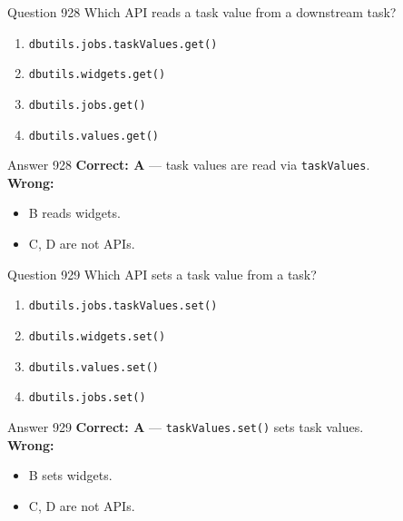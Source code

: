 \documentclass[aspectratio=169,11pt]{beamer}
\begin{document}
	\begin{frame}{Question 928}
		Which API reads a task value from a downstream task?
		\begin{enumerate}[label=\Alph*.]
			\item \texttt{dbutils.jobs.taskValues.get()}
			\item \texttt{dbutils.widgets.get()}
			\item \texttt{dbutils.jobs.get()}
			\item \texttt{dbutils.values.get()}
		\end{enumerate}
	\end{frame}
	\begin{frame}{Answer 928}
		\textbf{Correct: A} --- task values are read via \texttt{taskValues}.\\
		\vspace{0.5em}
		\textbf{Wrong:}
		\begin{itemize}
			\item B reads widgets.
			\item C, D are not APIs.
		\end{itemize}
	\end{frame}
	
	\begin{frame}{Question 929}
		Which API sets a task value from a task?
		\begin{enumerate}[label=\Alph*.]
			\item \texttt{dbutils.jobs.taskValues.set()}
			\item \texttt{dbutils.widgets.set()}
			\item \texttt{dbutils.values.set()}
			\item \texttt{dbutils.jobs.set()}
		\end{enumerate}
	\end{frame}
	\begin{frame}{Answer 929}
		\textbf{Correct: A} --- \texttt{taskValues.set()} sets task values.\\
		\vspace{0.5em}
		\textbf{Wrong:}
		\begin{itemize}
			\item B sets widgets.
			\item C, D are not APIs.
		\end{itemize}
	\end{frame}
	
\end{document}
